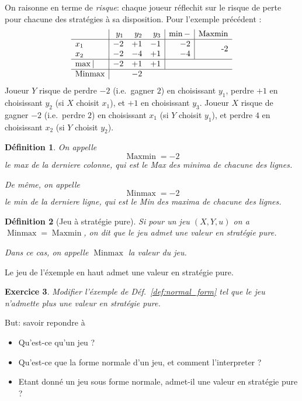 \documentclass[11pt]{scrartcl}
\theoremstyle{mydefinition}
\newtheorem{definition}{D\'efinition}
\newtheorem{exo}[definition]{Exercice}
\theoremstyle{myplain}
\DeclareMathOperator{\Maxmin}{Maxmin}
\DeclareMathOperator{\Minmax}{Minmax}
\begin{document}
On raisonne en terme de \emph{risque}: chaque joueur r\'eflechit sur le risque de perte pour chacune des strat\'egies \`a sa
disposition.
Pour l'exemple pr\'ec\'edent :
\[
\begin{array}{l|rrr | r|r}
    & y_1 & y_2 & y_3 & \min - & \Maxmin\\ \hline
x_1 &  -2 & +1 & -1 & -2 & \multirow{2}{*}{-2} \\ 
x_2 &   -2 & -4 & +1 & -4  \\ \hline
\max |   & -2 & +1 & +1 \\ \hline
\Minmax &\multicolumn{3}{c}{-2} 
\end{array}
\]
Joueur $Y$ risque de perdre $-2$ (i.e.\ gagner $2$) en choisissant $y_1$, perdre $+1$ en choisissant $y_2$ (si $X$ choisit $x_1$), et 
      $+1$ en choisissant $y_3$.
Joueur $X$ risque de gagner $-2$ (i.e.\ perdre $2$) en choisissant $x_1$ (si $Y$ choisit $y_1$), et perdre $4$ en choisissant $x_2$
 (si $Y$ choisit $y_2$).


\begin{definition}
 On appelle 
\[\Maxmin =-2\] 
le max de la derniere colonne, qui est le Max des minima de chacune des lignes.

De m\^eme, on appelle
\[ \Minmax = -2 \]
le min de la derniere ligne, qui est le Min des maxima de chacune des lignes.
\end{definition}

\begin{definition}[Jeu \`a strat\'egie pure]
  Si pour un jeu $(X,Y,u)$ on a $\Minmax = \Maxmin$, on dit que le jeu \emph{admet une valeur en strat\'egie pure}.

  Dans ce cas, on appelle $\Minmax$ \emph{la valeur du jeu}.
\end{definition}

Le jeu de l'\'exemple en haut admet une valeur en strat\'egie pure.

\begin{exo}
 Modifier l'\'exemple de D\'ef.\ \ref{def:normal_form} tel que le jeu n'admette plus une valeur en strat\'egie pure.
\end{exo}

\vspace{1em}

But: savoir repondre \`a
\begin{itemize}
 \item Qu'est-ce qu'un jeu ?
 \item Qu'est-ce que la forme normale d'un jeu, et comment l'interpreter ?
 \item Etant donn\'e un jeu sous forme normale, admet-il une valeur en strat\'egie pure ?
\end{itemize}

\vspace{1em}

\end{document}
